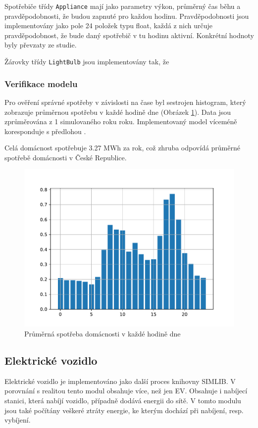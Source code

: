 \documentclass[12pt,a4paper]{article}
\begin{document}
Spotřebiče třídy \texttt{Appliance} mají jako parametry výkon, průměrný čas běhu a pravděpodobnosti, že budou zapnuté pro každou hodinu.
Pravděpodobnosti jsou implementovány jako pole 24 položek typu float,
každá z nich určuje pravděpodobnost, že bude daný spotřebič v tu hodinu aktivní.
Konkrétní hodnoty byly převzaty ze studie. \cite{TORRITI201737}

Žárovky třídy \texttt{LightBulb} jsou implementovány tak,
že


\subsubsection{Verifikace modelu}

Pro ověření správné spotřeby v závislosti na čase byl sestrojen histogram,
který zobrazuje průměrnou spotřebu v každé hodině dne (Obrázek \ref{fig:average_day_load}).
Data jsou zprůměrována z 1 simulovaného roku roku.
Implementovaný model víceméně koresponduje s předlohou \cite{TORRITI201737}.

Celá domácnost spotřebuje 3.27 MWh za rok, což zhruba odpovídá průměrné spotřebě domácnosti v České Republice\cite{CEZ}.

\begin{figure}
\includegraphics[width=\linewidth]{img/average_day_load.pdf}
\caption{Průměrná spotřeba domácnosti v každé hodině dne}
\label{fig:average_day_load}
\end{figure}





\subsection{Elektrické vozidlo}
Elektrické vozidlo je implementováno jako další proces knihovny SIMLIB.
V porovnání s realitou tento modul obsahuje více, než jen EV.
Obsahuje i nabíjecí stanici, která nabíjí vozidlo, případně dodává energii do sítě.
V tomto modulu jsou také počítány veškeré ztráty energie, ke kterým dochází při nabíjení, resp. vybíjení.
\end{document}
